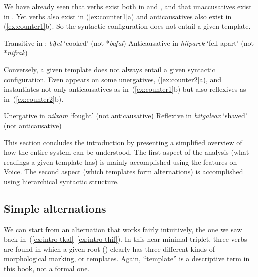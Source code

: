 \begin{exe}
\begin{xlist}
\begin{exe}
\begin{exe}
\begin{exe}
\begin{exe}
\begin{xlist}
\begin{exe}
\begin{xlist}
\begin{xlist}
\begin{xlist}
\begin{exe}
\begin{xlist}
\begin{exe}
\begin{exe}
\begin{xlist}
\begin{exe}
\begin{xlist}
\begin{exe}
\begin{exe}
\begin{xlist}
\begin{exe}
\begin{xlist}
\begin{exe}
\begin{xlist}
\begin{exe}
\begin{exe}
\begin{xlist}
\begin{exe}
\begin{exe}
\begin{xlist}
\begin{exe}
\begin{xlist}
\begin{exe}
\begin{xlist}
\begin{xlist}
\begin{exe}
We have already seen that  verbs exist both in {\tkal} and {\thif}, and that unaccusatives exist in {\tnif}. Yet  verbs also exist in {\tpie} (\ref{ex:counter1}a) and anticausatives also exist in {\thit} (\ref{ex:counter1}b). So the syntactic configuration does not entail a given template.
 \begin{exe}
 	\ex \label{ex:counter1}
 	\begin{xlist}
 		\ex Transitive in {\tpie}: \emph{biʃel} `cooked' (not {\tkal} *\emph{baʃal})
 		\ex Anticausative in {\thit} \emph{hitparek} `fell apart' (not {\tnif} *\emph{nifrak})
 \z 
 \z

Conversely, a given template does not always entail a given syntactic configuration. Even {\tnif} appears on some unergatives, (\ref{ex:counter2}a), and {\thit} instantiates not only anticausatives as in~(\ref{ex:counter1}b) but also reflexives as in~(\ref{ex:counter2}b).
\begin{exe}
	\ex \label{ex:counter2}
	\begin{xlist}
		\ex  Unergative in {\tnif} \emph{nilxam} `fought' (not anticausative)
		\ex Reflexive in {\thit} \emph{hitgaleax} `shaved' (not anticausative)
\z
\z

This section concludes the introduction by presenting a simplified overview of how the entire system can be understood. The first aspect of the analysis (what readings a given template has) is mainly accomplished using the features on Voice. The second aspect (which templates form alternations) is accomplished using hierarchical syntactic structure.

	\subsection{Simple alternations}
We can start from an alternation that works fairly intuitively, the one we saw back in~(\ref{ex:intro-tkal}--\ref{ex:intro-thif}). In this near-minimal triplet, three verbs are found in which a given root () clearly has three different kinds of morphological marking, or templates. Again, ``template'' is a descriptive term in this book, not a formal one.


\end{xlist}
\end{exe}
\end{xlist}
\end{exe}
\end{exe}
\end{xlist}
\end{xlist}
\end{exe}
\end{xlist}
\end{exe}
\end{xlist}
\end{exe}
\end{exe}
\end{xlist}
\end{exe}
\end{exe}
\end{xlist}
\end{exe}
\end{xlist}
\end{exe}
\end{xlist}
\end{exe}
\end{exe}
\end{xlist}
\end{exe}
\end{xlist}
\end{exe}
\end{exe}
\end{xlist}
\end{exe}
\end{xlist}
\end{xlist}
\end{xlist}
\end{exe}
\end{xlist}
\end{exe}
\end{exe}
\end{exe}
\end{exe}
\end{xlist}
\end{exe}
